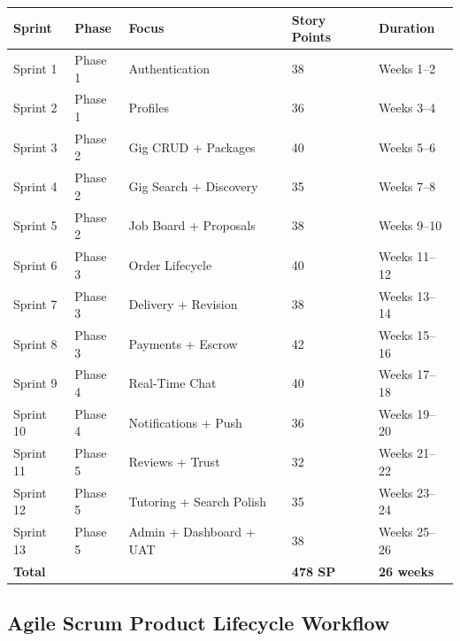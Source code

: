 \documentclass[a4paper,12pt]{article}
\begin{document}
\begin{table}[H]
\centering
\small
\begin{tabular}{|l|l|l|l|l|}
\hline
\textbf{Sprint} & \textbf{Phase} & \textbf{Focus} & \textbf{Story Points} & \textbf{Duration} \\
\hline
Sprint 1 & Phase 1 & Authentication & 38 & Weeks 1--2 \\
Sprint 2 & Phase 1 & Profiles & 36 & Weeks 3--4 \\
Sprint 3 & Phase 2 & Gig CRUD + Packages & 40 & Weeks 5--6 \\
Sprint 4 & Phase 2 & Gig Search + Discovery & 35 & Weeks 7--8 \\
Sprint 5 & Phase 2 & Job Board + Proposals & 38 & Weeks 9--10 \\
Sprint 6 & Phase 3 & Order Lifecycle & 40 & Weeks 11--12 \\
Sprint 7 & Phase 3 & Delivery + Revision & 38 & Weeks 13--14 \\
Sprint 8 & Phase 3 & Payments + Escrow & 42 & Weeks 15--16 \\
Sprint 9 & Phase 4 & Real-Time Chat & 40 & Weeks 17--18 \\
Sprint 10 & Phase 4 & Notifications + Push & 36 & Weeks 19--20 \\
Sprint 11 & Phase 5 & Reviews + Trust & 32 & Weeks 21--22 \\
Sprint 12 & Phase 5 & Tutoring + Search Polish & 35 & Weeks 23--24 \\
Sprint 13 & Phase 5 & Admin + Dashboard + UAT & 38 & Weeks 25--26 \\
\hline
\textbf{Total} & & & \textbf{478 SP} & \textbf{26 weeks} \\
\hline
\end{tabular}
\end{table}

\newpage

\subsection{Agile Scrum Product Lifecycle Workflow}
\end{document}
